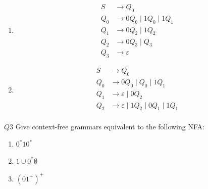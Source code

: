 \documentclass{article}
\theoremstyle{definition}
\theoremstyle{definition}
\theoremstyle{remark}
\begin{document}
\begin{enumerate}
    \item[$(i)$]\hspace*{1cm}
    \begin{align*}
        S&\longrightarrow Q_0\\
        Q_0&\longrightarrow0Q_0\mid 1Q_0\mid 1Q_1\\
        Q_1&\longrightarrow0Q_2\mid 1Q_2\\
        Q_2&\longrightarrow0Q_3\mid Q_3\\
        Q_3&\longrightarrow\varepsilon
    \end{align*}
    
    \item[$(ii)$]\hspace*{1cm}
    \begin{align*}
        S&\longrightarrow Q_0\\
        Q_0&\longrightarrow0Q_0\mid Q_0\mid 1Q_1\\
        Q_1&\longrightarrow\varepsilon\mid0Q_2\\
        Q_2&\longrightarrow\varepsilon\mid1Q_2\mid0Q_1\mid1Q_1\\
    \end{align*}
\end{enumerate}







\begin{questionbox}{$Q3$}
    Give context-free grammars equivalent to the following NFA:
    \begin{enumerate}
        \item[$(i)$] $0^\ast10^\ast$

        \item[$(ii)$] $1\cup0^\ast\emptyset$

        \item[$(iii)$] $(01^+)^+$
    \end{enumerate}
\end{questionbox}

\bigskip
\end{document}
